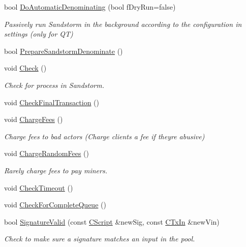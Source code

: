 \begin{DoxyCompactItemize}
bool \hyperlink{class_c_sandstorm_pool_a459d1986058ad736773fa9857390ba96}{Do\+Automatic\+Denominating} (bool f\+Dry\+Run=false)
\begin{DoxyCompactList}\small\item\em Passively run Sandstorm in the background according to the configuration in settings (only for Q\+T) \end{DoxyCompactList}\item 
bool \hyperlink{class_c_sandstorm_pool_a0348c28d46ac4180e2984336df1b4d50}{Prepare\+Sandstorm\+Denominate} ()
\item 
void \hyperlink{class_c_sandstorm_pool_a36dae9a698814612d6658c86eeea65b5}{Check} ()
\begin{DoxyCompactList}\small\item\em Check for process in Sandstorm. \end{DoxyCompactList}\item 
void \hyperlink{class_c_sandstorm_pool_a287096eef4d6e8dcd778e7fab1dd9c11}{Check\+Final\+Transaction} ()
\item 
void \hyperlink{class_c_sandstorm_pool_a76f820f131dbb15d80f826f0c788249a}{Charge\+Fees} ()
\begin{DoxyCompactList}\small\item\em Charge fees to bad actors (Charge clients a fee if they\textquotesingle{}re abusive) \end{DoxyCompactList}\item 
void \hyperlink{class_c_sandstorm_pool_ac01544d518171779e6a609dae48d4f75}{Charge\+Random\+Fees} ()
\begin{DoxyCompactList}\small\item\em Rarely charge fees to pay miners. \end{DoxyCompactList}\item 
void \hyperlink{class_c_sandstorm_pool_ac771fe0088165502c2b804b415b32750}{Check\+Timeout} ()
\item 
void \hyperlink{class_c_sandstorm_pool_a83d73d68f8df36be057d8dc6dad3fc28}{Check\+For\+Complete\+Queue} ()
\item 
bool \hyperlink{class_c_sandstorm_pool_aa3183dc7d64b9246cdd4b77423a71a67}{Signature\+Valid} (const \hyperlink{class_c_script}{C\+Script} \&new\+Sig, const \hyperlink{class_c_tx_in}{C\+Tx\+In} \&new\+Vin)
\begin{DoxyCompactList}\small\item\em Check to make sure a signature matches an input in the pool. \end{DoxyCompactList}\item 

\end{DoxyCompactItemize}
